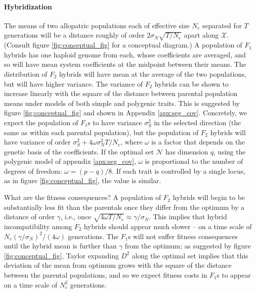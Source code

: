 \documentclass{article}
\newcommand{\1}{\mathbbm{1}}
\newcommand{\allS}{\mathcal{N}}
\newcommand{\optx}{\mathcal{X}}
\begin{document}
\paragraph{Hybridization}
The means of two allopatric populations each of effective size $N_e$ separated for $T$ generations
will be a distance roughly of order $2\sigma_N \sqrt{T/N_e}$ apart along $\optx$.
(Consult figure \ref{fig:conceptual_fig} for a conceptual diagram.)
A population of $F_1$ hybrids has one haploid genome from each,
whose coefficients are averaged,
and so will have mean system coefficients at the midpoint between their means.
The distribution of $F_2$ hybrids will have mean at the average of the two populations,
but will have higher variance.
The variance of $F_2$ hybrids can be shown to increase linearly with the square of the distance between
parental population means
under models of both simple and polygenic traits.
This is suggested by figure \ref{fig:conceptual_fig} and shown in Appendix \ref{apx:seg_cov}.
Concretely, we expect the population of $F_1$s to have variance $\sigma^2_S$ in the selected direction
(the same as within each parental population),
but the population of $F_2$ hybrids will have variance of order $\sigma^2_S + 4 \omega \sigma^2_N T/N_e$,
where $\omega$ is a factor that depends on the genetic basis of the coefficients.
If the optimal set $\allS$ has dimension $q$,
using the polygenic model of appendix \ref{apx:seg_cov}, 
$\omega$ is proportional to the number of degrees of freedom: $\omega = (p-q)/8$.
If each trait is controlled by a single locus, as in figure \ref{fig:conceptual_fig},
the value is similar.


What are the fitness consequences?
A population of $F_2$ hybrids will begin to be substantially less fit than the parentals
once they differ from the optimum by a distance of order $\gamma$,
i.e., once $\sqrt{4 \omega T/N_e} \approx \gamma / \sigma_N$.
This implies that hybrid incompatibility among $F_2$ hybrids should appear much slower --
on a time scale of $N_e (\gamma / \sigma_N)^2 / (4 \omega)$ generations.
The $F_1$s will not suffer fitness consequences until the hybrid mean is further than $\gamma$ from the optimum;
as suggested by figure \ref{fig:conceptual_fig}, Taylor expanding $D^2$ along the optimal set implies that
this deviation of the mean from optimum grows with the square of the distance between the parental populations,
and so we expect fitness costs in $F_1$s to appear on a time scale of $N_e^2$ generations.
\end{document}
